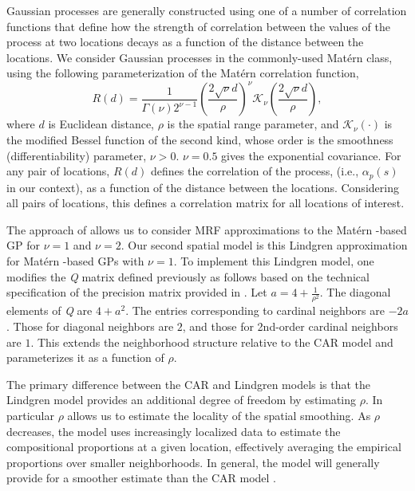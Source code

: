 \documentclass[10pt,letterpaper]{article}
\newcommand{\matern}{Mat\'{e}rn }
\begin{document}
Gaussian processes are generally constructed using
one of a number of correlation functions that define how the strength
of correlation between the values of the process at two locations
decays as a function of the distance between the locations. We consider
Gaussian processes in the commonly-used \matern
class, using the following parameterization of the \matern correlation
function, 
\begin{equation}
R(d)=\frac{1}{\Gamma(\nu)2^{\nu-1}}\left(\frac{2\sqrt{\nu}d}{\rho}\right)^{\nu}\mathcal{K}_{\nu}\left(\frac{2\sqrt{\nu}d}{\rho}\right),\label{eq:Matern}
\end{equation}
where $d$ is Euclidean distance, $\rho$ is the spatial range parameter,
and $\mathcal{K}_{\nu}(\cdot)$ is the modified Bessel function of
the second kind, whose order is the smoothness (differentiability)
parameter, $\nu>0$. $\nu=0.5$ gives the exponential covariance.
For any pair of locations, $R(d)$ defines the correlation of the
process, (i.e., $\alpha_{p}(s)$ in our context), as a function of
the distance between the locations. Considering all pairs of locations,
this defines a correlation matrix for all locations of interest. 

The approach of \cite{Lind:etal:2011} allows us to consider MRF
approximations to the \matern-based GP for $\nu=1$ and $\nu=2$.
Our second spatial model is this Lindgren approximation for \matern-based
GPs with $\nu=1$. To implement this Lindgren model, one modifies
the \emph{Q} matrix defined previously as follows based
on the technical specification of the precision matrix provided in
\cite{Lind:etal:2011}. Let $a=4+\frac{1}{\rho^{2}}$. The diagonal
elements of \emph{Q} are $4+a^{2}$. The entries corresponding to cardinal
neighbors are $-2a$. Those for diagonal neighbors are $2$, and those
for 2nd-order cardinal neighbors are $1$. This extends the neighborhood
structure relative to the CAR model and parameterizes it as a function
of $\rho$.

The primary difference between the CAR and Lindgren models is that
the Lindgren model provides an additional degree of freedom by estimating
$\rho$. In particular $\rho$ allows us to estimate the locality
of the spatial smoothing. As $\rho$ decreases, the
model uses increasingly localized data to estimate the compositional
proportions at a given location, effectively averaging the empirical
proportions over smaller neighborhoods. In general, the \cite{Lind:etal:2011}
model will generally provide for a smoother estimate than the CAR
model \cite{Paci:2013}. 
\end{document}
